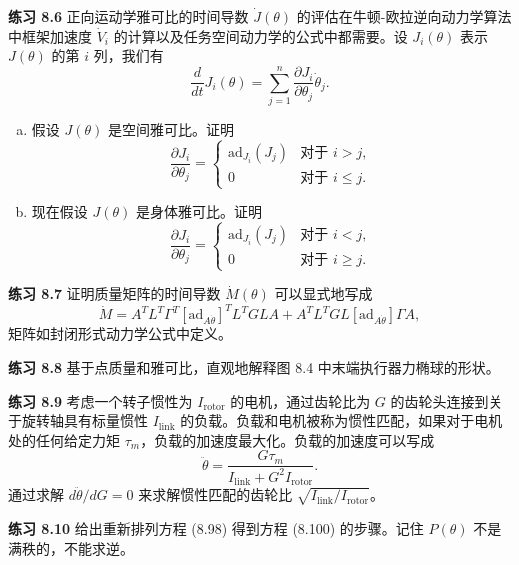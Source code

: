 \documentclass[12pt,a4paper]{article}
\begin{document}
\textbf{练习 8.6} 正向运动学雅可比的时间导数 $\dot{J}(\theta)$ 的评估在牛顿-欧拉逆向动力学算法中框架加速度 $\dot{V}_i$ 的计算以及任务空间动力学的公式中都需要。设 $J_i(\theta)$ 表示 $J(\theta)$ 的第 $i$ 列，我们有
\begin{equation}
\frac{d}{dt}J_i(\theta) = \sum_{j=1}^{n}\frac{\partial J_i}{\partial \theta_j}\dot{\theta}_j.
\end{equation}
\begin{enumerate}[(a)]
\item 假设 $J(\theta)$ 是空间雅可比。证明
\begin{equation}
\frac{\partial J_i}{\partial \theta_j} = \begin{cases}
\text{ad}_{J_i}(J_j) & \text{对于 } i > j, \\
0 & \text{对于 } i \leq j.
\end{cases}
\end{equation}
\item 现在假设 $J(\theta)$ 是身体雅可比。证明
\begin{equation}
\frac{\partial J_i}{\partial \theta_j} = \begin{cases}
\text{ad}_{J_i}(J_j) & \text{对于 } i < j, \\
0 & \text{对于 } i \geq j.
\end{cases}
\end{equation}
\end{enumerate}

\textbf{练习 8.7} 证明质量矩阵的时间导数 $\dot{M}(\theta)$ 可以显式地写成
\begin{equation}
\dot{M} = A^T L^T \Gamma^T [\text{ad}_{A\dot{\theta}}]^T L^T GLA + A^T L^T GL[\text{ad}_{A\dot{\theta}}]\Gamma A,
\end{equation}
矩阵如封闭形式动力学公式中定义。

\textbf{练习 8.8} 基于点质量和雅可比，直观地解释图 8.4 中末端执行器力椭球的形状。

\textbf{练习 8.9} 考虑一个转子惯性为 $I_{\text{rotor}}$ 的电机，通过齿轮比为 $G$ 的齿轮头连接到关于旋转轴具有标量惯性 $I_{\text{link}}$ 的负载。负载和电机被称为惯性匹配，如果对于电机处的任何给定力矩 $\tau_m$，负载的加速度最大化。负载的加速度可以写成
\begin{equation}
\ddot{\theta} = \frac{G\tau_m}{I_{\text{link}} + G^2 I_{\text{rotor}}}.
\end{equation}
通过求解 $d\ddot{\theta}/dG = 0$ 来求解惯性匹配的齿轮比 $\sqrt{I_{\text{link}}/I_{\text{rotor}}}$。

\textbf{练习 8.10} 给出重新排列方程 (8.98) 得到方程 (8.100) 的步骤。记住 $P(\theta)$ 不是满秩的，不能求逆。
\end{document}
